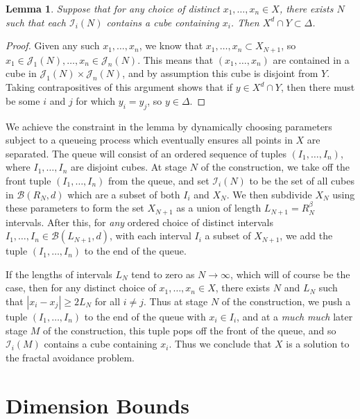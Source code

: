 \documentclass{article}
\theoremstyle{plain}
\newtheorem{lemma}{Lemma}
\theoremstyle{plain}
\begin{document}
\begin{multicols}{2}
\begin{lemma}
	Suppose that for any choice of distinct $x_1, \dots, x_n \in X$, there exists $N$ such that each $\mathcal{I}_i(N)$ contains a cube containing $x_i$. Then $X^d \cap Y \subset \Delta$.
\end{lemma}
\begin{proof}
	Given any such $x_1, \dots, x_n$, we know that $x_1, \dots, x_n \subset X_{N+1}$, so $x_1 \in \mathcal{J}_1(N), \dots, x_n \in \mathcal{J}_n(N)$. This means that $(x_1, \dots, x_n)$ are contained in a cube in $\mathcal{J}_1(N) \times \mathcal{J}_n(N)$, and by assumption this cube is disjoint from $Y$. Taking contrapositives of this argument shows that if $y \in X^d \cap Y$, then there must be some $i$ and $j$ for which $y_i = y_j$, so $y \in \Delta$.
\end{proof}


We achieve the constraint in the lemma by dynamically choosing parameters subject to a queueing process which eventually ensures all points in $X$ are separated. The queue will consist of an ordered sequence of tuples $(I_1, \dots, I_n)$, where $I_1 ,\dots, I_n$ are disjoint cubes. At stage $N$ of the construction, we take off the front tuple $(I_1, \dots, I_n)$ from the queue, and set $\mathcal{I}_i(N)$ to be the set of all cubes in $\mathcal{B}(R_N,d)$ which are a subset of both $I_i$ and $X_N$. We then subdivide $X_N$ using these parameters to form the set $X_{N+1}$ as a union of length $L_{N+1} = R_N^\beta$ intervals. After this, for {\it any} ordered choice of distinct intervals $I_1, \dots, I_n \in \mathcal{B}(L_{N+1},d)$, with each interval $I_i$ a subset of $X_{N+1}$, we add the tuple $(I_1, \dots, I_n)$ to the end of the queue.

If the lengths of intervals $L_N$ tend to zero as $N \to \infty$, which will of course be the case, then for any distinct choice of $x_1, \dots, x_n \in X$, there exists $N$ and $L_N$ such that $|x_i - x_j| \geq 2 L_N$ for all $i \neq j$. Thus at stage $N$ of the construction, we push a tuple $(I_1, \dots, I_n)$ to the end of the queue with $x_i \in I_i$, and at a {\it much} {\it much} later stage $M$ of the construction, this tuple pops off the front of the queue, and so $\mathcal{I}_i(M)$ contains a cube containing $x_i$. Thus we conclude that $X$ is a solution to the fractal avoidance problem.

\section{Dimension Bounds}


\end{multicols}
\end{document}
